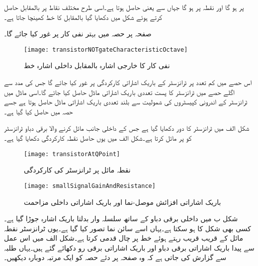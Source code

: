  پر   ہو گا اور  نقطہ  پر ہو گا جہاں سے  یعنی  حاصل ہوتا ہے۔اسی طرح مختلف نقاط پر  بالمقابل  حاصل کرتے ہوئے شکل  میں دکھایا گیا   بالمقابل  کا خط کھینچا جاتا ہے۔

صفحہ  پر حصہ  میں بہتر نفی کار پر غور کیا جائے گا۔
\begin{figure}
\centering
\texttt{[image: transistorNOTgateCharacteristicOctave]}
\caption{نفی کار کا خارجی اشارہ  بالمقابل داخلی اشارہ خط}
\label{شکل_ٹرانزسٹر_نفی_کار_مکمل_خط}
\end{figure}
  اس حصے میں کم تعدد پر ٹرانزسٹر  کے باریک اشاراتی کارکردگی پر غور کیا جائے گا جس کی مدد سے اگلے حصے میں ٹرانزسٹر کا پست تعددی باریک اشاراتی ماڈل حاصل کیا جائے گا۔اسی ماڈل میں ٹرانزسٹر کے اندرونی کپیسٹروں کی شمولیت سے بلند تعددی باریک اشاراتی ماڈل حاصل ہوتا ہے جسے  حصہ  میں حاصل کیا گیا ہے۔ 

شکل  الف میں ٹرانزسٹر کا دور دکھایا گیا ہے جس کے داخلی جانب مائل کرنے والا برقی دباو ٹرانزسٹر کو   پر مائل کرتا ہے۔شکل  الف میں یوں حاصل نقطہ کارکردگی   دکھایا گیا ہے۔
\begin{figure}
\centering
\texttt{[image: transistorAtQPoint]}
\caption{نقطہ مائل پر ٹرانزسٹر کی کارکردگی}
\label{شکل_نکتہ_مائل_پر_ٹرانزسٹر_کی_کارکردگی}
\end{figure}
%
\begin{figure}
\centering
\texttt{[image: smallSignalGainAndResistance]}
\caption{باریک اشاراتی افزائش موصل-نما اور باریک اشاراتی داخلی مزاحمت}
\label{شکل_باریک_اشاراتی_موصلیت_نما_اور_مزاحمت}
\end{figure}
شکل  ب میں داخلی برقی دباو  کے ساتھ سلسلہ وار بدلتا باریک اشارہ  جوڑا گیا ہے۔  کسی بھی شکل کا ہو سکتا ہے۔یہاں اسے سائن نما تصور کیا گیا ہے۔یوں ٹرانزسٹر نقطہ مائل کے قریب قریب رہتے ہوئے خط   پر چال قدمی کرتا ہے۔شکل   الف میں اس عمل سے پیدا باریک اشاراتی برقی دباو   اور باریک اشاراتی برقی رو  دکھائے گئے ہیں۔یہاں طلبہ سے گزارش کی جاتی ہے کہ وہ صفحہ \pageref{حصہ_کارتیسی_محدد_اور_ترسیم}  پر دئے حصہ  کو ایک مرتبہ دوبارہ دیکھیں۔

